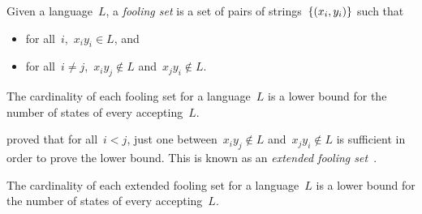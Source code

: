 \begin{defn}
	Given a language~$L$, a \emph{fooling set} is a set of pairs of strings~$\{(x_i,y_i)\}$ such that
	\begin{itemize}
		\item for all~$i$,~$x_iy_i\in L$, and
		\item for all~$i\ne j$,~$x_iy_j\notin L$ and~$x_jy_i\notin L$.
	\end{itemize}
\end{defn}
\begin{thrm}
	The cardinality of each fooling set for a language~$L$ is a lower bound for the number of states of every \ONFA accepting~$L$.
\end{thrm}

\citeauthor{Bir92} proved that for all~$i<j$, just one between~$x_iy_j\notin L$ and~$x_jy_i\notin L$ is sufficient in order to prove the lower bound.
This is known as an \emph{extended fooling set}~\cite{Bir92}.
\begin{thrm}
	The cardinality of each extended fooling set for a language~$L$ is a lower bound for the number of states of every \ONFA accepting~$L$.
\end{thrm}
